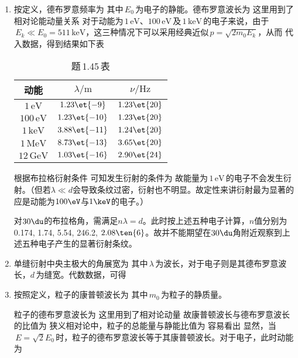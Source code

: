 \begin{enumerate}[label=1.\arabic*]
\item
按定义，德布罗意频率为
其中$\,E_0\,$为电子的静能。德布罗意波长为
这里用到了相对论能动量关系
对于动能为$\,1\,\mathrm{eV}$、$100\,\mathrm{eV}\,$及$\,1\,\mathrm{keV}\,$的电子来说，由于$\,E_k\ll E_0=511\,\mathrm{keV}$，这三种情况下可以采用经典近似$\,p=\sqrt{2m_0E_k}$，从而
代入数据，得到结果如下表
\begin{table}[h]
    \centering
    \begin{tabular}{c|c|c}
    \hline
        \rule{0pt}{13pt}动能 & $\lambda/\mathrm{m}$ & $\nu/\mathrm{Hz}$ \\
        \hline
        \rule{0pt}{13pt}$1\,\mathrm{eV}$ & $1.23\et{-9}$ & $1.23\et{20}$ \\
        $100\,\mathrm{eV}$ & $1.23\et{-10}$ & $1.23\et{20}$ \\
        $1\,\mathrm{keV}$ & $3.88\et{-11}$ & $1.24\et{20}$ \\
        $1\,\mathrm{MeV}$ & $8.73\et{-13}$ & $3.65\et{20}$ \\
        $12\,\mathrm{GeV}$ & $1.03\et{-16}$ & $2.90\et{24}$ \\
    \hline
    \end{tabular}
    \caption{题\,1.45\,表}
\end{table}\par
根据布拉格衍射条件
可知发生衍射的条件为
故能量为$\,1\,\mathrm{eV}\,$的电子不会发生衍射。（但若$\lambda \ll d$会导致条纹过密，衍射也不明显。故定性来讲衍射最为显著的应是动能为$100\eV$与$1\keV$的电子。）

对$30\du$的布拉格角，需满足$n\lambda = d$。此时按上述五种电子计算，$n$值分别为 0.174, 1.74, 5.54, 246.2, $2.08\ten{6}$。故并不能期望在$30\du$角附近观察到上述五种电子产生的显著衍射条纹。

\item
单缝衍射中央主极大的角展宽为
其中$\,\lambda\,$为波长，对于电子则是其德布罗意波长，$d\,$为缝宽。代数数据，可得

\item
按照定义，粒子的康普顿波长为
其中$\,m_0\,$为粒子的静质量。\par
粒子的德布罗意波长为
这里用到了相对论动量
故康普顿波长与德布罗意波长的比值为
狭义相对论中，粒子的总能量与静能比值为
容易看出
显然，当$\,E=\sqrt{2}E_0\,$时，粒子的德布罗意波长等于其康普顿波长。对于电子，此时动能为


\end{enumerate}
